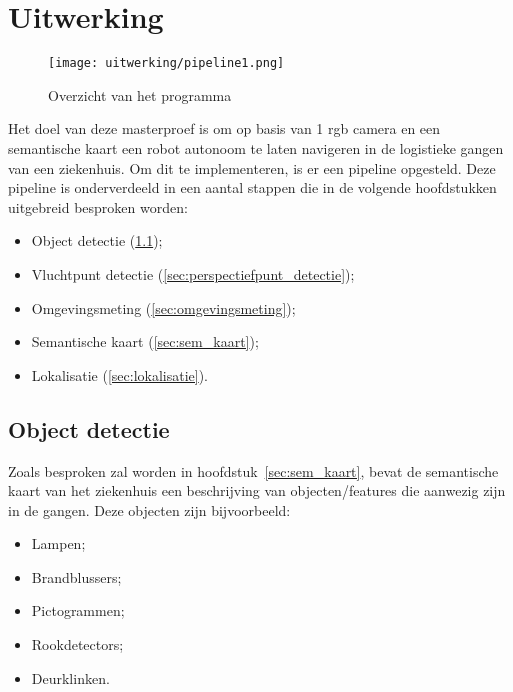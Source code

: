 
\chapter{Uitwerking}

\begin{figure}[!h]
    \centering
    \texttt{[image: uitwerking/pipeline1.png]}
    \caption{Overzicht van het programma}
    \label{fig:pipeline1}
\end{figure}

Het doel van deze masterproef is om op basis van 1 \gls{rgb} camera en een semantische kaart een robot autonoom te laten navigeren in de logistieke gangen van een ziekenhuis.
Om dit te implementeren, is er een pipeline opgesteld.
Deze pipeline is onderverdeeld in een aantal stappen die in de volgende hoofdstukken uitgebreid besproken worden:
\begin{itemize}
    \item Object detectie (\ref{sec:object_detectie});
    \item Vluchtpunt detectie (\ref{sec:perspectiefpunt_detectie});
    \item Omgevingsmeting (\ref{sec:omgevingsmeting});
    \item Semantische kaart (\ref{sec:sem_kaart});
    \item Lokalisatie (\ref{sec:lokalisatie}).
\end{itemize}


\section{Object detectie}\label{sec:object_detectie}

Zoals besproken zal worden in hoofdstuk~\ref{sec:sem_kaart}, bevat de semantische kaart van het ziekenhuis een beschrijving van objecten/features die aanwezig zijn in de gangen.
Deze objecten zijn bijvoorbeeld:
\begin{itemize}
    \item Lampen;
    \item Brandblussers;
    \item Pictogrammen;
    \item Rookdetectors;
    \item Deurklinken.
\end{itemize}


